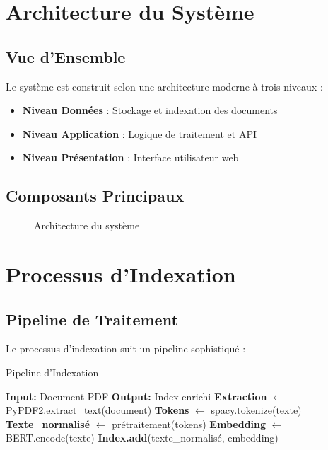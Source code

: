 \documentclass[12pt,a4paper]{article}
\begin{document}
\section{Architecture du Système}

\subsection{Vue d'Ensemble}
Le système est construit selon une architecture moderne à trois niveaux :
\begin{itemize}
    \item \textbf{Niveau Données} : Stockage et indexation des documents
    \item \textbf{Niveau Application} : Logique de traitement et API
    \item \textbf{Niveau Présentation} : Interface utilisateur web
\end{itemize}

\subsection{Composants Principaux}
\begin{figure}[H]
    \centering
    \caption{Architecture du système}
\end{figure}

\section{Processus d'Indexation}

\subsection{Pipeline de Traitement}
Le processus d'indexation suit un pipeline sophistiqué :

\begin{algorithm}[H]
\caption{Pipeline d'Indexation}
\begin{algorithmic}[1]
\STATE \textbf{Input:} Document PDF
\STATE \textbf{Output:} Index enrichi
\STATE
\STATE \textbf{Extraction} $\leftarrow$ PyPDF2.extract\_text(document)
\STATE \textbf{Tokens} $\leftarrow$ spacy.tokenize(texte)
\STATE \textbf{Texte\_normalisé} $\leftarrow$ prétraitement(tokens)
\STATE \textbf{Embedding} $\leftarrow$ BERT.encode(texte)
\STATE \textbf{Index.add}(texte\_normalisé, embedding)
\end{algorithmic}
\end{algorithm}
\end{document}
